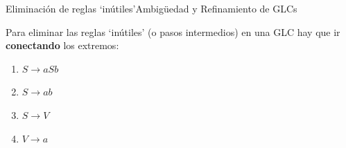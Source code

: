 \documentclass[spanish, handout]{beamer}
\begin{document}
\begin{frame}{Eliminación de reglas `inútiles'}{Ambigüedad y Refinamiento de GLCs}

    Para eliminar las reglas `inútiles' (o pasos intermedios) en una GLC hay que ir \textbf{conectando} los extremos: \pause

    \bigskip

    \begin{enumerate}
        \item $S \to aSb$
        \item $S \to ab$
        \item \alert<3->{$S \to V$}
        \item \alert<3->{$V \to a$}
    \end{enumerate} \pause

    \bigskip



    
\end{frame}


% 
% 
\end{document}
